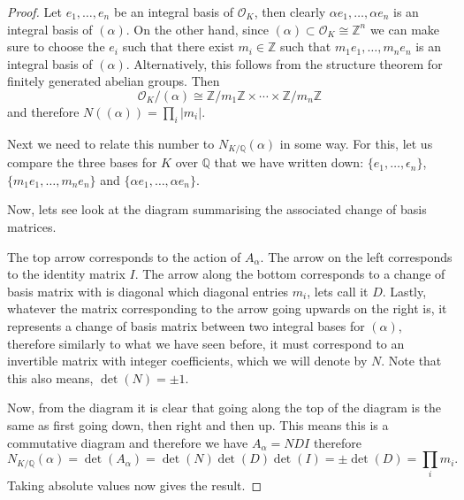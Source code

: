 \documentclass[11pt,a4paper]{report}
\theoremstyle{plain}
\theoremstyle{definition}
\theoremstyle{definition}
\newcommand{\ZZ}{\mathbb{Z}}
\def\QQ{\mathbb{Q}}
\def \a{\alpha}
\def \e {\epsilon}
\def \OO {\mathcal{O}}
\begin{document}
\begin{proof}
Let $e_1,\dots,e_n$ be an integral basis of $\OO_K$, then clearly $\a e_1,\dots,\a e_n$ is an integral basis of $(\a)$. On the other hand, since $(\a) \subset \OO_K \cong \ZZ^n$ we can make sure to choose the $e_i$ such that there exist $m_i \in \ZZ$ such that $m_1e_1,\dots,m_ne_n$ is an integral basis of $(\a)$. Alternatively, this follows from the structure theorem for finitely generated abelian groups.  Then \[\OO_K/(\a) \cong \ZZ/m_1\ZZ \times \cdots \times \ZZ/m_n\ZZ\] and therefore $N((\a))=\prod_i |m_i|$.

Next we need to relate this number to $N_{K/\QQ}(\a)$ in some way. For this, let us compare the three bases for $K$ over $\QQ$ that we have written down: $\{e_1,\dots,\e_n\}$, $\{m_1e_1,\dots,m_ne_n\}$ and $\{\a e_1,\dots,\a e_n\}$.

Now, lets see look at the diagram summarising the associated change of basis matrices.

\begin{center}
\end{center} 

The top arrow corresponds to the action of $A_\a$. The arrow on the left corresponds to the identity matrix $I$. The arrow along the bottom corresponds to a change of basis matrix with is diagonal which diagonal entries $m_i$, lets call it $D$. Lastly, whatever the matrix corresponding to the arrow going upwards on the right is, it represents a change of basis matrix between two integral bases for $(\a)$, therefore  similarly to what we have seen before, it must correspond to an invertible matrix with integer coefficients, which we will denote by $N$. Note that this also means, $\det(N)=\pm 1$. 

Now, from the diagram it is clear that going along the top of the diagram is the same as first going down, then right and then up. This means this is a commutative diagram and therefore we have $A_\a=NDI$ therefore \[N_{K/\QQ}(\a)=\det(A_\a)=\det(N)\det(D)\det(I)=\pm \det(D)=\prod_i m_i.\] Taking absolute values now gives the result.
\end{proof}
\end{document}
